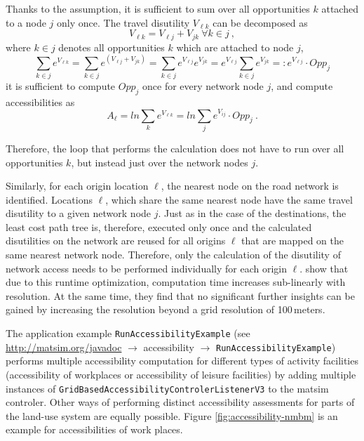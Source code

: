 Thanks to the assumption, it is sufficient to sum over all opportunities $k$ attached to a node $j$ only 
once. The travel disutility $V_{\ell k}$ can be decomposed as
\begin{equation}
V_{\ell k} = V_{\ell j} + V_{jk} \ \forall k \in j \ ,
\end{equation}
where $k \in j$ denotes all opportunities $k$ which are attached to node $j$,
\begin{equation}
\sum_{k \in j} e^{ V_{\ell k}} 
%
= \sum_{k \in j} e^{ (V_{\ell j}+ V_{jk})} 
%
= \sum_{k \in j} e^{ V_{\ell j}} e^{ V_{jk}} 
%
= e^{ V_{\ell j}} \sum_{k \in j} e^{ V_{jk}} 
%
=: e^{ V_{\ell j}} \cdot Opp_j
\end{equation} 
it is sufficient to compute $Opp_j$ once for every network node $j$, and compute accessibilities as
\begin{equation}
A_\ell = ln \sum_k e^{ V_{\ell k}}
%
= ln \sum_j e^{ V_{ij}} \cdot Opp_j \ .
\end{equation}

Therefore, the loop that performs the calculation does not have to run over all opportunities $k$, but
instead just over the network nodes $j$.

Similarly, for each origin location $\ell$, the nearest node on the road network is identified.
Locations $\ell$, which share the same nearest node have the same travel disutility to a given network
node $j$. Just as in the case of the destinations, the least cost path tree is, therefore, executed
only once and the calculated disutilities on the network are reused for all origins $\ell$ that are
mapped on the same nearest network node. Therefore, only the calculation of the disutility of network
access needs to be performed individually for each origin $\ell$.
\citet{NicolaiNagelHiResAccessibilityMethod} show that due to this runtime optimization, computation
time increases sub-linearly with resolution. At the same time, they find that no significant further
insights can be gained by increasing the resolution beyond a grid resolution of 100\,meters.

The application example \lstinline{RunAccessibilityExample} (see \url{http://matsim.org/javadoc} $\to$ 
accessibility $\to$ \lstinline{RunAccessibilityExample}) performs multiple accessibility computation for
different types of activity facilities (\eg accessibility of workplaces or accessibility of leisure
facilities) by adding multiple instances of \lstinline{GridBasedAccessibilityControlerListenerV3}
to the \gls{matsim} controler. Other ways of performing distinct accessibility assessments for parts of
the land-use system are equally possible. Figure \ref{fig:accessibility-nmbm} is an example for
accessibilities of work places.

